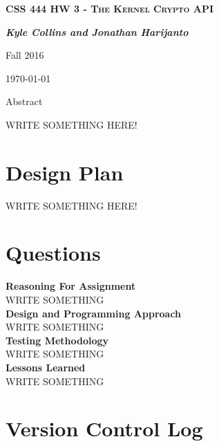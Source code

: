 \documentclass[letterpaper,10pt,draftclsnofoot,titlepage,onecolumn]{IEEEtran}
\begin{document}
	
	\begin{titlepage}
		\centering
		{\scshape\LARGE \textbf{CSS 444 HW 3 - The Kernel Crypto API}\par}
		{\LARGE\itshape \textbf{Kyle Collins and Jonathan Harijanto}\par}
		{\LARGE Fall 2016\par}
		{\LARGE \today\par}
		
		{\LARGE Abstract\par}
		WRITE SOMETHING HERE!
		
	\end{titlepage}
	
	\clearpage
	\tableofcontents
	
	\clearpage
	\section{Design Plan}
	
	WRITE SOMETHING HERE!

	\clearpage
	\section{Questions}
	
	\textbf{Reasoning For Assignment}\\
		WRITE SOMETHING	
		\\
		
	\textbf{Design and Programming Approach}\\
		WRITE SOMETHING
		\\

	\textbf{Testing Methodology}\\
		WRITE SOMETHING
		\\ 

	\textbf{Lessons Learned}\\
		WRITE SOMETHING
		\\

	\clearpage

	\section{Version Control Log}
	
\end{document}
